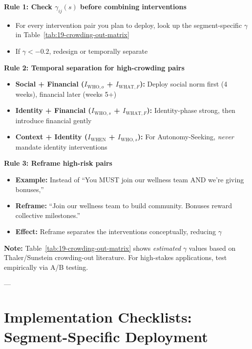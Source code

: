 \begin{tcolorbox}[colback=red!10!white, colframe=red!75!black, title=\textbf{3 Rules to Avoid Crowding-Out Backfire}]

\textbf{Rule 1: Check $\gamma_{ij}(s)$ before combining interventions}
\begin{itemize}[nosep]
\item For every intervention pair you plan to deploy, look up the segment-specific $\gamma$ in Table~\ref{tab:19-crowding-out-matrix}
\item If $\gamma < -0.2$, redesign or temporally separate
\end{itemize}

\textbf{Rule 2: Temporal separation for high-crowding pairs}
\begin{itemize}[nosep]
\item \textbf{Social + Financial ($I_{\text{WHO},o}$ + $I_{\text{WHAT},F}$):} Deploy social norm first (4 weeks), financial later (weeks 5+)
\item \textbf{Identity + Financial ($I_{\text{WHO},s}$ + $I_{\text{WHAT},F}$):} Identity-phase strong, then introduce financial gently
\item \textbf{Context + Identity ($I_{\text{WHEN}}$ + $I_{\text{WHO},s}$):} For Autonomy-Seeking, \textit{never} mandate identity interventions
\end{itemize}

\textbf{Rule 3: Reframe high-risk pairs}
\begin{itemize}[nosep]
\item \textbf{Example:} Instead of ``You MUST join our wellness team AND we're giving bonuses,''
\item \textbf{Reframe:} ``Join our wellness team to build community. Bonuses reward collective milestones.''
\item \textbf{Effect:} Reframe separates the interventions conceptually, reducing $\gamma$
\end{itemize}

\end{tcolorbox}

\textbf{Note:} Table~\ref{tab:19-crowding-out-matrix} shows \textit{estimated} $\gamma$ values based on Thaler/Sunstein crowding-out literature. For high-stakes applications, test empirically via A/B testing.

---

\section{Implementation Checklists: Segment-Specific Deployment}
\label{sec:19-implementation}

